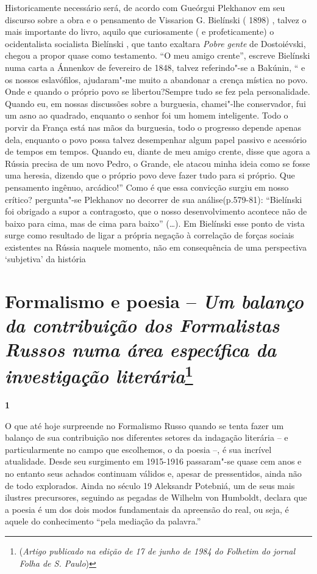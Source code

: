 Historicamente necessário será, de acordo com Gueórgui Plekhanov em seu
discurso sobre a obra e o pensamento de Vissarion G. Bielínski ( 1898) ,
talvez o mais importante do livro, aquilo que curiosamente ( e
profeticamente) o ocidentalista socialista Bielínski , que tanto
exaltara \emph{Pobre gente} de Dostoiévski, chegou a propor quase como
testamento. ``O meu amigo crente'', escreve Bielínski numa carta a
Ánnenkov de fevereiro de 1848, talvez referindo"-se a Bakúnin, `` e os
nossos eslavófilos, ajudaram"-me muito a abandonar a crença mística no
povo. Onde e quando o próprio povo se libertou?Sempre tudo se fez pela
personalidade. Quando eu, em nossas discussões sobre a burguesia,
chamei"-lhe conservador, fui um asno ao quadrado, enquanto o senhor foi
um homem inteligente. Todo o porvir da França está nas mãos da
burguesia, todo o progresso depende apenas dela, enquanto o povo possa
talvez desempenhar algum papel passivo e acessório de tempos em tempos.
Quando eu, diante de meu amigo crente, disse que agora a Rússia precisa
de um novo Pedro, o Grande, ele atacou minha ideia como se fosse uma
heresia, dizendo que o próprio povo deve fazer tudo para si próprio. Que
pensamento ingênuo, arcádico!'' Como é que essa convicção surgiu em
nosso crítico? pergunta"-se Plekhanov no decorrer de sua
análise(p.579-81): ``Bielínski foi obrigado a supor a contragosto, que o
nosso desenvolvimento acontece não de baixo para cima, mas de cima para
baixo'' (\ldots{}). Em Bielínski esse ponto de vista surge como resultado de
ligar a própria negação à correlação de forças sociais existentes na
Rússia naquele momento, não em consequência de uma perspectiva
`subjetiva' da história

\chapter{Formalismo e poesia -- \emph{Um balanço da contribuição dos Formalistas Russos numa
área específica da investigação literária}\footnote{(\emph{Artigo
  publicado na edição de 17 de junho de 1984 do Folhetim do jornal Folha
  de S. Paulo})}}

\textbf{1}

O que até hoje surpreende no Formalismo Russo quando se tenta fazer um
balanço de sua contribuição nos diferentes setores da indagação
literária -- e particularmente no campo que escolhemos, o da poesia --,
é sua incrível atualidade. Desde seu surgimento em 1915-1916 passaram"-se
quase cem anos e no entanto seus achados continuam válidos e, apesar de
pressentidos, ainda não de todo explorados. Ainda no século 19 Aleksandr
Potebniá, um de seus mais ilustres precursores, seguindo as pegadas de
Wilhelm von Humboldt, declara que a poesia é um dos dois modos
fundamentais da apreensão do real, ou seja, é aquele do conhecimento
``pela mediação da palavra.''

